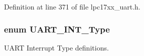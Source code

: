 Definition at line 371 of file lpc17xx\+\_\+uart.\+h.

\subsubsection[{\texorpdfstring{U\+A\+R\+T\+\_\+\+I\+N\+T\+\_\+\+Type}{UART_INT_Type}}]{\setlength{\rightskip}{0pt plus 5cm}enum {\bf U\+A\+R\+T\+\_\+\+I\+N\+T\+\_\+\+Type}}\hypertarget{group___u_a_r_t___public___types_ga7ee4c5ddc0e165158d0d9f1f03e1b66c}{}\label{group___u_a_r_t___public___types_ga7ee4c5ddc0e165158d0d9f1f03e1b66c}


U\+A\+RT Interrupt Type definitions. 

